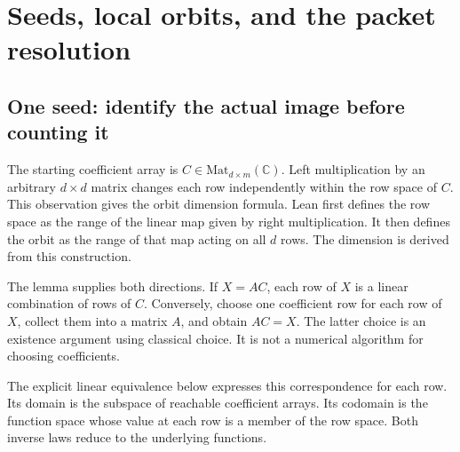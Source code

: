 \section{Seeds, local orbits, and the packet resolution}
\label{sec:seeds}

\subsection{One seed: identify the actual image before counting it}
The starting coefficient array is $C\in\mathrm{Mat}_{d\times m}(\mathbb C)$. Left multiplication by an arbitrary $d\times d$ matrix changes each row independently within the row space of $C$. This observation gives the orbit dimension formula. Lean first defines the row space as the range of the linear map given by right multiplication. It then defines the orbit as the range of that map acting on all $d$ rows. The dimension is derived from this construction.


The lemma  supplies both directions. If $X=AC$, each row of $X$ is a linear combination of rows of $C$. Conversely, choose one coefficient row for each row of $X$, collect them into a matrix $A$, and obtain $AC=X$. The latter choice is an existence argument using classical choice. It is not a numerical algorithm for choosing coefficients.

The explicit linear equivalence below expresses this correspondence for each row. Its domain is the subspace of reachable coefficient arrays. Its codomain is the function space whose value at each row is a member of the row space. Both inverse laws reduce to the underlying functions.



